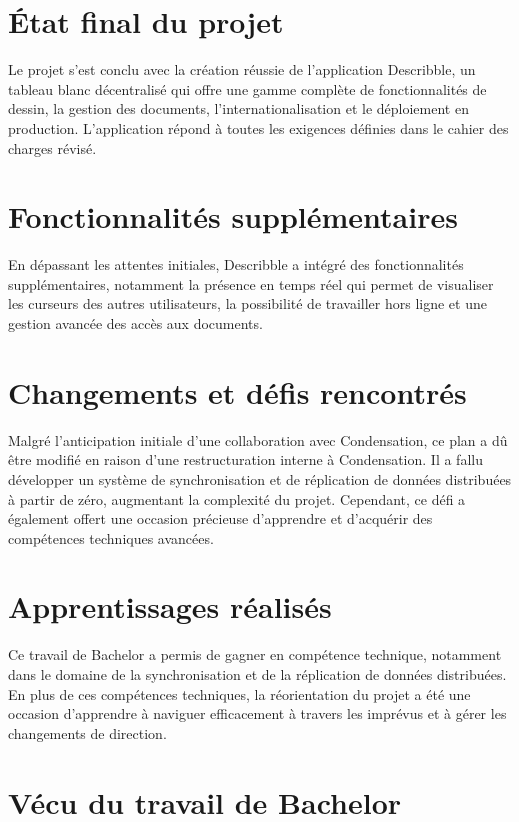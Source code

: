 \section{État final du projet}

Le projet s'est conclu avec la création réussie de l'application Describble, un tableau blanc décentralisé qui offre une gamme complète de fonctionnalités de dessin, la gestion des documents, l'internationalisation et le déploiement en production. L'application répond à toutes les exigences définies dans le cahier des charges révisé.

\section{Fonctionnalités supplémentaires}

En dépassant les attentes initiales, Describble a intégré des fonctionnalités supplémentaires, notamment la présence en temps réel qui permet de visualiser les curseurs des autres utilisateurs, la possibilité de travailler hors ligne et une gestion avancée des accès aux documents.

\section{Changements et défis rencontrés}

Malgré l'anticipation initiale d'une collaboration avec Condensation, ce plan a dû être modifié en raison d'une restructuration interne à Condensation. Il a fallu développer un système de synchronisation et de réplication de données distribuées à partir de zéro, augmentant la complexité du projet. Cependant, ce défi a également offert une occasion précieuse d'apprendre et d'acquérir des compétences techniques avancées.

\section{Apprentissages réalisés}

Ce travail de Bachelor a permis de gagner en compétence technique, notamment dans le domaine de la synchronisation et de la réplication de données distribuées. En plus de ces compétences techniques, la réorientation du projet a été une occasion d'apprendre à naviguer efficacement à travers les imprévus et à gérer les changements de direction.

\section{Vécu du travail de Bachelor}

